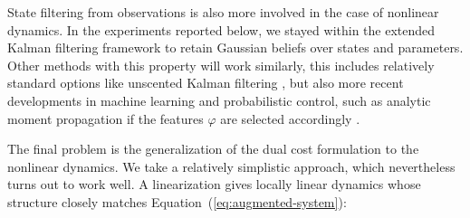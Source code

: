 State filtering from observations is also more involved in the case of nonlinear
dynamics. In the experiments reported below, we stayed within the extended
Kalman filtering framework \cite[]{Sarkka:2013:Bayesian} to retain
Gaussian beliefs over states and parameters. Other methods with this
property will work similarly, this includes relatively standard options like
unscented Kalman filtering \cite{Uhlmann:1995:Dynamic}, but also more recent
developments in machine learning and probabilistic control, such as analytic
moment propagation if the features $\varphi$ are selected accordingly
\cite{Deisenroth.Rasmussen:2011:PILCO}.

The final problem is the generalization of the dual cost formulation to the
nonlinear dynamics. We take a relatively simplistic approach, which nevertheless
turns out to work well. A linearization gives locally linear dynamics whose
structure closely matches Equation~(\ref{eq:augmented-system}):
